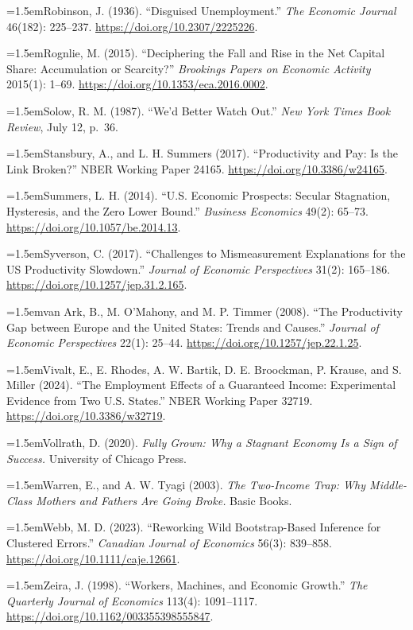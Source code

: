 \documentclass[12pt]{article}
\theoremstyle{plain}
\newcommand{\refentry}[1]{\par\hangindent=1.5em\hangafter=1\noindent #1}
\begin{document}
{\refentry{Robinson, J. (1936). ``Disguised Unemployment.'' \emph{The Economic Journal} 46(182): 225--237. \url{https://doi.org/10.2307/2225226}.}
\refentry{Rognlie, M. (2015). ``Deciphering the Fall and Rise in the Net Capital Share: Accumulation or Scarcity?'' \emph{Brookings Papers on Economic Activity} 2015(1): 1--69. \url{https://doi.org/10.1353/eca.2016.0002}.}
\refentry{Solow, R. M. (1987). ``We'd Better Watch Out.'' \emph{New York Times Book Review}, July 12, p.~36.}
\refentry{Stansbury, A., and L. H. Summers (2017). ``Productivity and Pay: Is the Link Broken?'' NBER Working Paper 24165. \url{https://doi.org/10.3386/w24165}.}
\refentry{Summers, L. H. (2014). ``U.S. Economic Prospects: Secular Stagnation, Hysteresis, and the Zero Lower Bound.'' \emph{Business Economics} 49(2): 65--73. \url{https://doi.org/10.1057/be.2014.13}.}
\refentry{Syverson, C. (2017). ``Challenges to Mismeasurement Explanations for the US Productivity Slowdown.'' \emph{Journal of Economic Perspectives} 31(2): 165--186. \url{https://doi.org/10.1257/jep.31.2.165}.}
\refentry{van Ark, B., M. O'Mahony, and M. P. Timmer (2008). ``The Productivity Gap between Europe and the United States: Trends and Causes.'' \emph{Journal of Economic Perspectives} 22(1): 25--44. \url{https://doi.org/10.1257/jep.22.1.25}.}
\refentry{Vivalt, E., E. Rhodes, A. W. Bartik, D. E. Broockman, P. Krause, and S. Miller (2024). ``The Employment Effects of a Guaranteed Income: Experimental Evidence from Two U.S. States.'' NBER Working Paper 32719. \url{https://doi.org/10.3386/w32719}.}
\refentry{Vollrath, D. (2020). \emph{Fully Grown: Why a Stagnant Economy Is a Sign of Success.} University of Chicago Press.}
\refentry{Warren, E., and A. W. Tyagi (2003). \emph{The Two-Income Trap: Why Middle-Class Mothers and Fathers Are Going Broke.} Basic Books.}
\refentry{Webb, M. D. (2023). ``Reworking Wild Bootstrap-Based Inference for Clustered Errors.'' \emph{Canadian Journal of Economics} 56(3): 839--858. \url{https://doi.org/10.1111/caje.12661}.}
\refentry{Zeira, J. (1998). ``Workers, Machines, and Economic Growth.'' \emph{The Quarterly Journal of Economics} 113(4): 1091--1117. \url{https://doi.org/10.1162/003355398555847}.}\par
}
\end{document}
